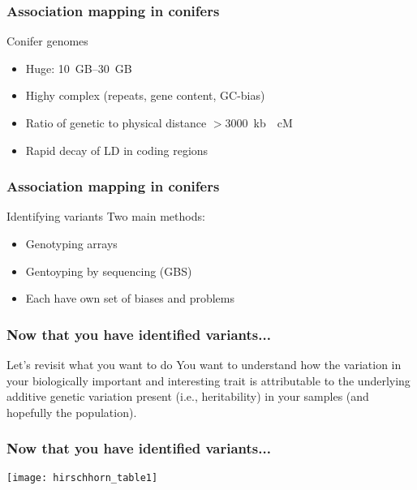\begin{frame}
\frametitle{Association mapping in conifers}
\begin{block}{Conifer genomes}
\begin{itemize}
\item{Huge: \SIrange{10}{30}{GB}}
\item{Highy complex (repeats, gene content, GC-bias)}
\item{Ratio of genetic to physical distance $>$\SI{3000}{kb \per cM}}
\item{Rapid decay of LD in coding regions}
\end{itemize}
\end{block}
\tiny
\citet{Uchiyama:2013ci,Hirschhorn:2005cka}
\end{frame}

\begin{frame}
\frametitle{Association mapping in conifers}
\begin{block}{Identifying variants}
Two main methods:
\begin{itemize}
\item{Genotyping arrays}
\item{Gentoyping by sequencing (GBS)}
\item{Each have own set of biases and problems}
\end{itemize}
\end{block}
\end{frame}

\begin{frame}
\frametitle{Now that you have identified variants...}
\begin{block}{Let's revisit what you want to do}
\centering
You want to understand how the variation in your biologically important and
interesting trait is attributable to the underlying additive genetic variation 
present (i.e., heritability) in your samples (and hopefully the population).
\end{block}
\end{frame}

\begin{frame}
\frametitle{Now that you have identified variants...}
\begin{block}{}
\centering
\texttt{[image: hirschhorn\_table1]}\\
\tiny
\citet[Table 1]{Hirschhorn:2005cka}
\end{block}
\end{frame}

